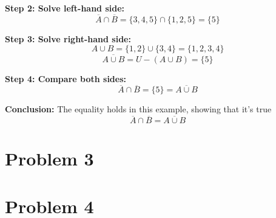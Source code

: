 \documentclass{article}
\begin{document}
\textbf{Step 2: Solve left-hand side:}  
\[
\overline{A} \cap \overline{B} = \{3,4,5\} \cap \{1,2,5\} = \{5\}
\]

\textbf{Step 3: Solve right-hand side:}  
\[
A \cup B = \{1,2\} \cup \{3,4\} = \{1,2,3,4\}
\]  
\[
\overline{A \cup B} = U - (A \cup B) = \{5\}
\]

\textbf{Step 4: Compare both sides:}  
\[
\overline{A} \cap \overline{B} = \{5\} = \overline{A \cup B}
\]

\textbf{Conclusion:} The equality holds in this example, showing that it's true
\[
\overline{A} \cap \overline{B} = \overline{A \cup B}
\] 

\section*{Problem 3}


\section*{Problem 4}
\end{document}
